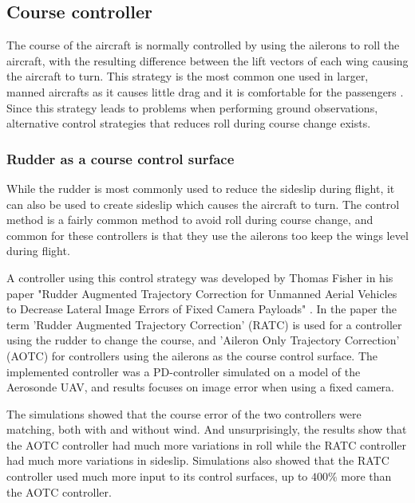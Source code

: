 \subsection{Course controller}
The course of the aircraft is normally controlled by using the ailerons to roll the aircraft, with the resulting difference between the lift vectors of each wing causing the aircraft to turn. This strategy is the most common one used in larger, manned aircrafts as it causes little drag and it is comfortable for the passengers \cite{skidToTurnMills}. Since this strategy leads to problems when performing ground observations, alternative control strategies that reduces roll during course change exists.

\subsubsection{Rudder as a course control surface}
While the rudder is most commonly used to reduce the sideslip during flight, it can also be used to create sideslip which causes the aircraft to turn. The control method is a fairly common method to avoid roll during course change, and common for these controllers is that they use the ailerons too keep the wings level during flight.

A controller using this control strategy was developed by Thomas Fisher in his paper "Rudder Augmented Trajectory Correction for Unmanned Aerial Vehicles to Decrease Lateral Image Errors of Fixed Camera Payloads" \cite{ratcFISHER}. In the paper the term 'Rudder Augmented Trajectory Correction' (RATC) is used for a controller using the rudder to change the course, and 'Aileron Only Trajectory Correction' (AOTC) for controllers using the ailerons as the course control surface. The implemented controller was a PD-controller simulated on a model of the Aerosonde UAV, and results focuses on image error when using a fixed camera.


The simulations showed that the course error of the two controllers were matching, both with and without wind. And unsurprisingly, the results show that the AOTC controller had much more variations in roll while the RATC controller had much more variations in sideslip. Simulations also showed that the RATC controller used much more input to its control surfaces, up to $400 \%$ more than the AOTC controller.

